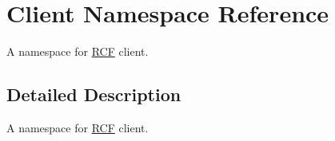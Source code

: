 \hypertarget{namespace_client}{}\section{Client Namespace Reference}
\label{namespace_client}


A namespace for \hyperlink{namespace_r_c_f}{R\+C\+F} client.  




\subsection{Detailed Description}
A namespace for \hyperlink{namespace_r_c_f}{R\+C\+F} client. 